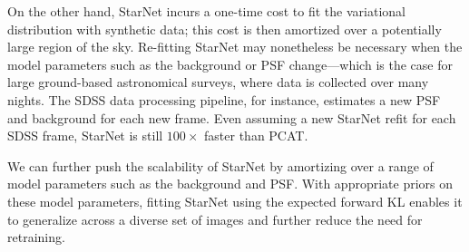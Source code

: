 On the other hand, StarNet incurs a one-time cost to fit the variational distribution with synthetic data; this cost is then amortized over a potentially large region of the sky.
Re-fitting StarNet may nonetheless be necessary when the model parameters
such as the background or PSF change---which is the case for 
large ground-based astronomical surveys, where data is collected over many nights. 
The SDSS data processing pipeline, for instance, estimates a new PSF and background
for each new frame. 
Even assuming a new StarNet refit for each SDSS frame, 
StarNet is still $100\times$ faster than PCAT. 

We can further push the scalability of StarNet by 
amortizing over a range of model parameters such as the background and PSF. 
With appropriate priors on these model parameters,
fitting StarNet using the  
expected forward KL enables it to generalize across a diverse set of images 
and further reduce the need for retraining.

